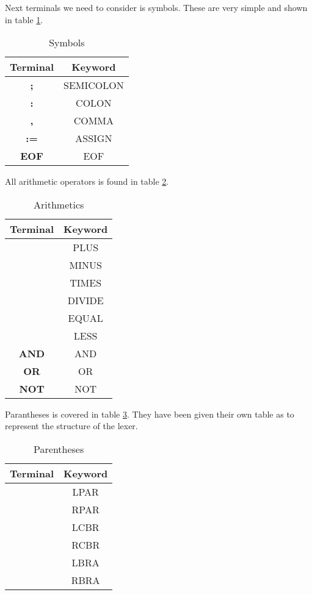 \documentclass[10pt]{article}
\begin{document}
Next terminals we need to consider is symbols. These are very simple and shown in table \ref{tab:symbols}.

\begin{table}[h!]
\centering
\begin{tabular}{|c|c|}
\hline
Terminal & Keyword \\
\hline
\textbf{;} & SEMICOLON \\
\textbf{:} & COLON \\
\textbf{,} & COMMA \\
\textbf{:=} & ASSIGN \\
\textbf{EOF} & EOF \\
\hline
\end{tabular}
\caption{\label{tab:symbols}Symbols}
\end{table}

All arithmetic operators is found in table \ref{tab:arithmetics}.

\begin{table}[h!]
\centering
\begin{tabular}{|c|c|}
\hline
Terminal & Keyword \\
\hline
\text{+} & PLUS \\
\text{-} & MINUS \\
\text{*} & TIMES \\
\text{/} & DIVIDE \\
\text{=} & EQUAL \\
\text{<} & LESS \\
\textbf{AND} & AND \\
\textbf{OR} & OR \\
\textbf{NOT} & NOT \\
\hline
\end{tabular}
\caption{\label{tab:arithmetics}Arithmetics}
\end{table}

Parantheses is covered in table \ref{tab:parentheses}. They have been given their own table as to represent the structure of the lexer. 

\begin{table}[h!]
\centering
\begin{tabular}{|c|c|}
\hline
Terminal & Keyword \\
\hline
\text{(} & LPAR \\
\text{)} & RPAR \\
\text{\{} & LCBR \\
\text{\}} & RCBR \\
\text{[} & LBRA \\
\text{]} & RBRA \\
\hline
\end{tabular}
\caption{\label{tab:parentheses}Parentheses}
\end{table}
\end{document}
